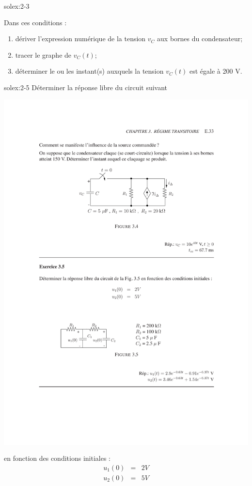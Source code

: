 \begin{exwithsol}{solex:2-3}
\begin{enumerate}
\end{enumerate}
Dans ces conditions :
\begin{enumerate}
	\item d\'eriver l'expression num\'erique de la tension $v_C$ aux bornes du condensateur;
	\item tracer le graphe de $v_C(t)$;
	\item d\'eterminer le ou les instant(s) auxquels la tension $v_C(t)$ est \'egale \`a 200 V.
\end{enumerate}
\end{exwithsol}

\begin{exwithsol}{solex:2-5}
	\label{ex:2-5}
D\'eterminer la r\'eponse libre du circuit suivant
\begin{center}
	\includegraphics[width=0.8\linewidth]{exercices/ex-3-5}
\end{center}
en fonction des conditions initiales :
\begin{eqnarray*}
	u_1(0)&=&2V\\
	u_2(0)&=&5V\\
\end{eqnarray*}


\end{exwithsol}

